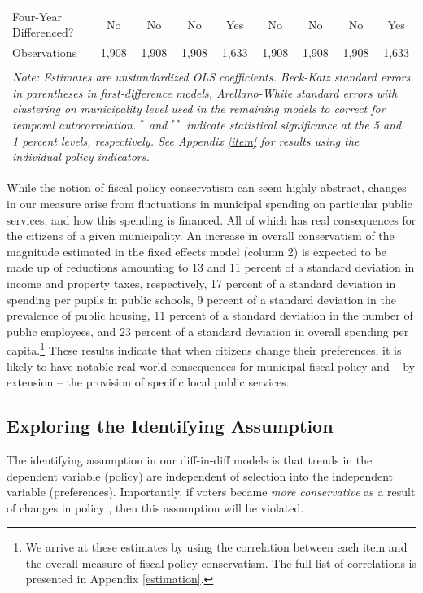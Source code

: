 \documentclass[a4paper,12pt]{article}
\begin{document}
\begin{landscape}
\begin{table}[!htbp]
\begin{tabular}{@{\extracolsep{5pt}}lcccccccc}
			Four-Year Differenced? & No & No & No & Yes & No & No & No & Yes \\ 
			Observations & 1,908 & 1,908 & 1,908 & 1,633 & 1,908 & 1,908 & 1,908 & 1,633 \\ 
			\hline 
			\hline \\[-1.8ex] 
			\multicolumn{9}{p{25 cm}}{\emph{Note: Estimates are unstandardized OLS coefficients. Beck-Katz standard errors in parentheses in first-difference models, Arellano-White standard errors with clustering on municipality level used in the remaining models to correct for temporal autocorrelation. $^{*}$ and $^{**}$ indicate statistical significance at the 5 and 1 percent levels, respectively. See Appendix \ref{item} for results using the individual policy indicators.}} \\
		\end{tabular} 
	\end{table}
	
\end{landscape}

While the notion of fiscal policy conservatism can seem highly abstract, changes in our measure arise from fluctuations in municipal spending on particular public services, and how this spending is financed. All of which has real consequences for the citizens of a given municipality. An increase in overall conservatism of the magnitude estimated in the fixed effects model (column 2) is expected to be made up of reductions amounting to 13 and 11 percent of a standard deviation in income and property taxes, respectively, 17 percent of a standard deviation in spending per pupils in public schools, 9 percent of a standard deviation in the prevalence of public housing, 11 percent of a standard deviation in the number of public employees, and 23 percent of a standard deviation in overall spending per capita.\footnote{We arrive at these estimates by using the correlation between each item and the overall measure of fiscal policy conservatism. The full list of correlations is presented in Appendix \ref{estimation}.} These results indicate that when citizens change their preferences, it is likely to have notable real-world consequences for municipal fiscal policy and -- by extension -- the provision of specific local public services. 

\subsection*{Exploring the Identifying Assumption}
The identifying assumption in our diff-in-diff models is that trends in the dependent variable (policy) are independent of selection into the independent variable (preferences). Importantly, if voters became \emph{more conservative} as a result of changes in policy \cite[cf.][]{lenz2013follow}, then this assumption will be violated.
\end{document}
